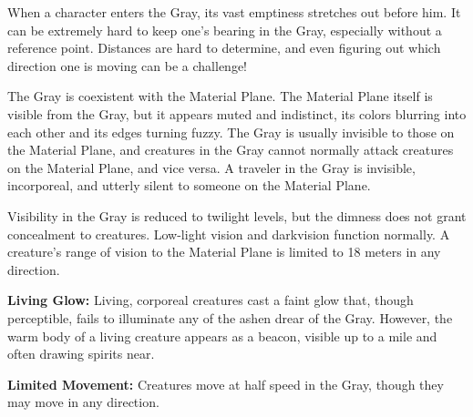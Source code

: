 When a character enters the Gray, its vast emptiness stretches out before him. It can be extremely hard to keep one's bearing in the Gray, especially without a reference point. Distances are hard to determine, and even figuring out which direction one is moving can be a challenge!

The Gray is coexistent with the Material Plane. The Material Plane itself is visible from the Gray, but it appears muted and indistinct, its colors blurring into each other and its edges turning fuzzy. The Gray is usually invisible to those on the Material Plane, and creatures in the Gray cannot normally attack creatures on the Material Plane, and vice versa. A traveler in the Gray is invisible, incorporeal, and utterly silent to someone on the Material Plane.

Visibility in the Gray is reduced to twilight levels, but the dimness does not grant concealment to creatures. Low-light vision and darkvision function normally. A creature's range of vision to the Material Plane is limited to 18 meters in any direction. %

\textbf{Living Glow:} Living, corporeal creatures cast a faint glow that, though perceptible, fails to illuminate any of the ashen drear of the Gray. However, the warm body of a living creature appears as a beacon, visible up to a mile and often drawing spirits near.

\textbf{Limited Movement:} Creatures move at half speed in the Gray, though they may move in any direction.

